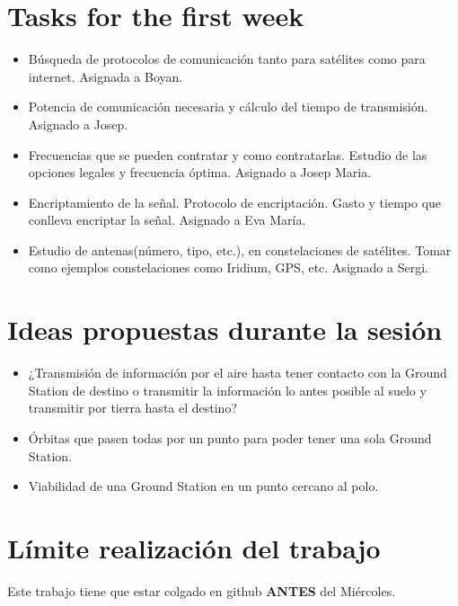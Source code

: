 \documentclass[12pt,a4paper]{report}
\author{Eva María Urbano González}
\begin{document}
\section{Tasks for the first week}
\begin{itemize}
\item Búsqueda de protocolos de comunicación tanto para satélites como para internet. Asignada a Boyan.
\item Potencia de comunicación necesaria y cálculo del tiempo de transmisión. Asignado a Josep.
\item Frecuencias que se pueden contratar y como contratarlas. Estudio de las opciones legales y frecuencia óptima. Asignado a Josep Maria. 
\item Encriptamiento de la señal. Protocolo de encriptación. Gasto y tiempo que conlleva encriptar la señal. Asignado a Eva María.
\item Estudio de antenas(número, tipo, etc.), en constelaciones de satélites. Tomar como ejemplos constelaciones como Iridium, GPS, etc. Asignado a Sergi.
\end{itemize}
\section{Ideas propuestas durante la sesión}
\begin{itemize}
\item ¿Transmisión de información por el aire hasta tener contacto con la Ground Station de destino o transmitir la información lo antes  posible al suelo y transmitir por tierra hasta el destino?
\item Órbitas que pasen todas por un punto para poder tener una sola Ground Station.
\item Viabilidad de una Ground Station en un punto cercano al polo. 
\end{itemize}
\section{Límite realización del trabajo}
Este trabajo tiene que estar colgado en github \textbf{ANTES} del Miércoles. 
\end{document}
